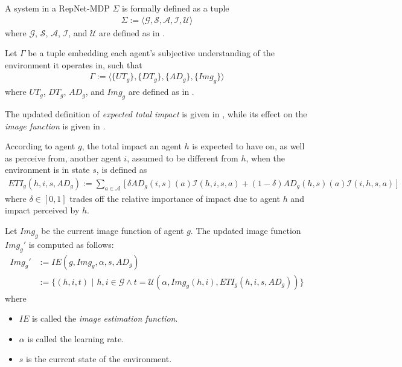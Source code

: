 \begin{definition}
\label{def:system}
A system in a RepNet-MDP $\Sigma$ is formally defined as a tuple
\begin{align*}
    \Sigma := \big \langle \mathcal{G}, \mathcal{S}, \mathcal{A}, \mathcal{I}, \mathcal{U} \big \rangle
  \end{align*}
where $\mathcal{G}$, $\mathcal{S}$, $\mathcal{A}$, $\mathcal{I}$, and $\mathcal{U}$ are defined as in .
\end{definition}

\begin{definition}[Agents]
\label{def:agents}
Let $\Gamma$ be a tuple embedding each agent's subjective understanding of the environment it operates in, such that
\begin{align*}
    \Gamma := \big \langle \{UT_g\}, \{DT_g\}, \{AD_g\}, \{Img_g\} \big \rangle
  \end{align*}
where $UT_g$, $DT_g$, $AD_g$, and $Img_g$ are defined as in .
\end{definition}

The updated definition of \textit{expected total impact} is given in , while its effect on the \textit{image function} is given in .
\begin{definition}
\label{def:imp}
According to agent $g$, the total impact an agent $h$ is expected to have on, as well as perceive from, another agent $i$, assumed to be different from $h$, when the environment is in state $s$, is defined as
\begin{align*}
    ETI_{g} (h, i, s, AD_g) :=  \sum_{a \in \mathcal{A}} \, \big[ \, \delta AD_g(i, s)(a) \mathcal{I}(h, i, s, a)  + (1 - \delta) AD_g(h, s)(a) \mathcal{I}(i, h, s, a) \, \big]
\end{align*}
where $\delta \in [0,1]$ trades off the relative importance of impact due to agent $h$ and impact perceived by $h$.
\end{definition}

\begin{definition}
\label{def:img}
Let $Img_g$ be the current image function of agent $g$. The updated image function $Img_g'$ is computed as follows:
\begin{align*}
     Img_g' &:= IE(g,Img_g,\alpha, s, AD_g) \\&:= \Big\{(h,i, t) \,\,\Big| \,\,h,i \in \mathcal{G} \land t =  \mathcal{U}(\alpha, Img_g(h,i), ETI_{g}(h, i,s, AD_g)) \Big\}
\end{align*}
where
\begin{itemize}
    \item $IE$ is called the \textit{image estimation function}.
    \item $\alpha$ is called the learning rate.
    \item $s$ is the current state of the environment.
\end{itemize}
\end{definition}

